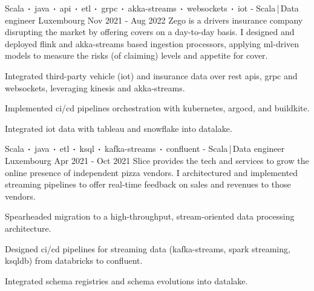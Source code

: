 \begin{cventries}

    \cventry
    {Scala$\sqbig$java$\sqbig$api$\sqbig$etl$\sqbig$grpc$\sqbig$akka-streams$\sqbig$websockets$\sqbig$iot}
    { - Scala\,|\,Data engineer}
    {Luxembourg}
    {Nov 2021 - Aug 2022}
    {Zego is a drivers insurance company disrupting the market by offering covers on a day-to-day basis. I designed and deployed flink and akka-streams based ingestion processors, applying ml-driven models to measure the risks (of claiming) levels and appetite for cover.}
    {
        \begin{cvitems}
            \item{Integrated third-party vehicle (iot) and insurance data over rest apis, grpc and websockets, leveraging kinesis and akka-streams.}
            \item{Implemented ci/cd pipelines orchestration with kubernetes, argocd, and buildkite.}
            \item{Integrated iot data with tableau and snowflake into datalake.}
        \end{cvitems}
    }


    \cventry
    {Scala$\sqbig$java$\sqbig$etl$\sqbig$ksql$\sqbig$kafka-streams$\sqbig$confluent}
    { - Scala\,|\,Data engineer}
    {Luxembourg}
    {Apr 2021 - Oct 2021}
    {Slice provides the tech and services to grow the online presence of independent pizza vendors. I architectured and implemented streaming pipelines to offer real-time feedback on sales and revenues to those vendors.}
    {
        \begin{cvitems}
            \item{Spearheaded migration to a high-throughput, stream-oriented data processing architecture.}
            \item{Designed ci/cd pipelines for streaming data (kafka-streams, spark streaming, ksqldb) from databricks to confluent.}
            \item{Integrated schema registries and schema evolutions into datalake.}
        \end{cvitems}
    }


\end{cventries}
